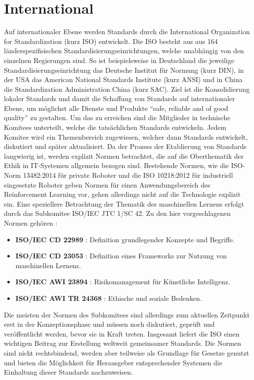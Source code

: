 \section{International}\label{sec:international}
Auf internationaler Ebene werden Standards durch die International Organization for Standardization \cite{isoabout} (kurz ISO) entwickelt.
Die ISO besteht aus aus 164 länderspezifisischen Standardisierungseinrichtungen, welche unabhängig von den einzelnen Regierungen sind.
So ist beispielsweise in Deutschland die jeweilige Standardisierungseinrichtung das Deutsche Institut für Normung \cite{din} (kurz DIN), in der USA das American National Standards Institute \cite{ansi} (kurz ANSI) und in China die Standardization Administration China \cite{sac} (kurz SAC).
Ziel ist die Konsolidierung lokaler Standards und damit die Schaffung von Standards auf internationaler Ebene, um möglichst alle Dienste und Produkte \enquote{safe, reliable and of good quality} \cite{iso_benefits} zu gestalten.
Um das zu erreichen sind die Mitglieder in technische Komitees unterteilt, welche die tatsächlichen Standards entwickeln.
Jedem Komitee wird ein Themenbereich zugewiesen, welcher dann Standards entwickelt, diskutiert und später aktualisiert.
\ab 
Da der Prozess der Etablierung von Standards langwierig ist, werden explizit Normen betrachtet, die auf die Oberthematik der Ethik in IT-Systemen allgemein bezogen sind.
Bestehende Normen, wie die ISO-Norm 13482:2014 für private Roboter und die ISO 10218:2012 \cite[S. 50]{wittpahl2019} für industriell eingesetzte Roboter geben Normen für einen Anwendungsbereich des Reinforcement Learning vor, gehen allerdings nicht auf die Technologie explizit ein.
Eine speziellere Betrachtung der Thematik des maschinellen Lernens erfolgt durch das Subkomitee ISO/IEC JTC 1/SC 42.
Zu den hier vorgeschlagenen Normen gehören \cite{iso_sc42}:
\begin{itemize}
    \item \textbf{ISO/IEC CD 22989} \cite{iso22989}: Definition grundlegender Konzepte und Begriffe.
    \item \textbf{ISO/IEC CD 23053} \cite{iso23053}: Definition eines Frameworks zur Nutzung von maschinellen Lernens.
    \item \textbf{ISO/IEC AWI 23894} \cite{iso23894}: Risikomanagement für Künstliche Intelligenz.
    \item \textbf{ISO/IEC AWI TR 24368} \cite{iso24368}: Ethische und soziale Bedenken.
\end{itemize}
Die meisten der Normen des Subkomitees sind allerdings zum aktuellen Zeitpunkt erst in der Konzeptionsphase und müssen noch diskutiert, geprüft und veröffentlicht werden, bevor sie in Kraft treten.
Insgesamt liefert die ISO einen wichtigen Beitrag zur Erstellung weltweit gemeinsamer Standards.
Die Normen sind nicht rechtsbindend, werden aber teilweise als Grundlage für Gesetze genutzt und bieten die Möglichkeit für Herausgeber entsprechender Systemen die Einhaltung dieser Standards nachzuweisen.